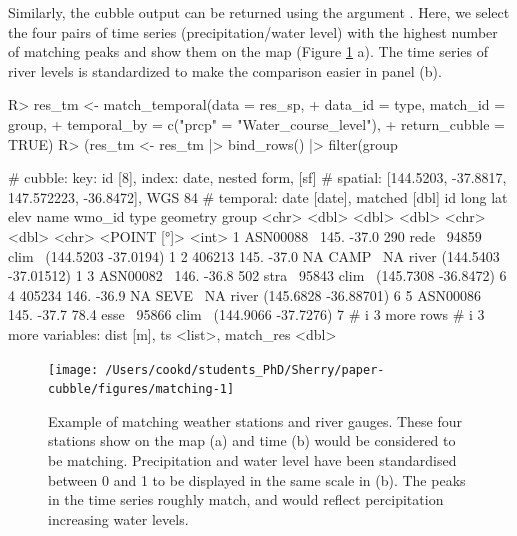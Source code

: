 \documentclass[
  shortnames]{jss}
\begin{document}
Similarly, the cubble output can be returned using the argument . Here, we select the four pairs of time series (precipitation/water level) with the highest number of matching peaks and show them on the map (Figure \ref{fig:matching} a). The time series of river levels is standardized to make the comparison easier in panel (b).

\begin{CodeChunk}
\begin{CodeInput}
R> res_tm <- match_temporal(data =  res_sp,
+                          data_id = type, match_id = group,
+                          temporal_by = c("prcp" = "Water_course_level"),
+                          return_cubble = TRUE)
R> (res_tm <- res_tm |> bind_rows() |> filter(group %
\end{CodeInput}
\begin{CodeOutput}
# cubble:   key: id [8], index: date, nested form, [sf]
# spatial:  [144.5203, -37.8817, 147.572223, -36.8472], WGS 84
# temporal: date [date], matched [dbl]
  id         long   lat  elev name  wmo_id type              geometry group
  <chr>     <dbl> <dbl> <dbl> <chr>  <dbl> <chr>          <POINT [°]> <int>
1 ASN00088~  145. -37.0 290   rede~  94859 clim~  (144.5203 -37.0194)     1
2 406213     145. -37.0  NA   CAMP~     NA river (144.5403 -37.01512)     1
3 ASN00082~  146. -36.8 502   stra~  95843 clim~  (145.7308 -36.8472)     6
4 405234     146. -36.9  NA   SEVE~     NA river (145.6828 -36.88701)     6
5 ASN00086~  145. -37.7  78.4 esse~  95866 clim~  (144.9066 -37.7276)     7
# i 3 more rows
# i 3 more variables: dist [m], ts <list>, match_res <dbl>
\end{CodeOutput}
\end{CodeChunk}

\begin{CodeChunk}
\begin{figure}

{\centering \texttt{[image: /Users/cookd/students\_PhD/Sherry/paper-cubble/figures/matching-1]} 

}

\caption[Example of matching weather stations and river gauges]{Example of matching weather stations and river gauges. These four stations show on the map (a) and time (b) would be considered to be matching. Precipitation and water level have been standardised between 0 and 1 to be displayed in the same scale in (b). The peaks in the time series roughly match, and would reflect percipitation increasing water levels.}\label{fig:matching}
\end{figure}
\end{CodeChunk}
\end{document}
